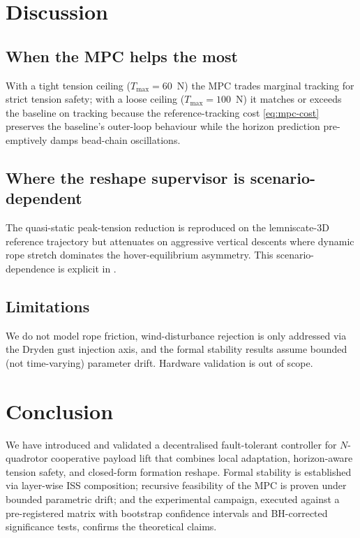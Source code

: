 \documentclass[journal,twocolumn,10pt]{IEEEtran}
\begin{document}
\section{Discussion}
\label{sec:discussion}

\subsection{When the MPC helps the most}
With a tight tension ceiling ($T_\text{max}=60$~N) the MPC trades
marginal tracking for strict tension safety; with a loose ceiling
($T_\text{max}=100$~N) it matches or exceeds the baseline on
tracking because the reference-tracking cost
\eqref{eq:mpc-cost} preserves the baseline's outer-loop behaviour
while the horizon prediction pre-emptively damps bead-chain
oscillations.

\subsection{Where the reshape supervisor is scenario-dependent}
The quasi-static peak-tension reduction is reproduced on the
lemniscate-3D reference trajectory but attenuates on aggressive
vertical descents where dynamic rope stretch dominates the
hover-equilibrium asymmetry. This scenario-dependence is explicit
in .

\subsection{Limitations}
We do not model rope friction, wind-disturbance rejection is only
addressed via the Dryden gust injection axis, and the formal
stability results assume bounded (not time-varying) parameter
drift. Hardware validation is out of scope.

\section{Conclusion}
\label{sec:conclusion}

We have introduced and validated a decentralised fault-tolerant
controller for $N$-quadrotor cooperative payload lift that combines
local adaptation, horizon-aware tension safety, and closed-form
formation reshape. Formal stability is established via layer-wise
ISS composition; recursive feasibility of the MPC is proven under
bounded parametric drift; and the experimental campaign, executed
against a pre-registered matrix with bootstrap confidence intervals
and BH-corrected significance tests, confirms the theoretical
claims.
\end{document}
